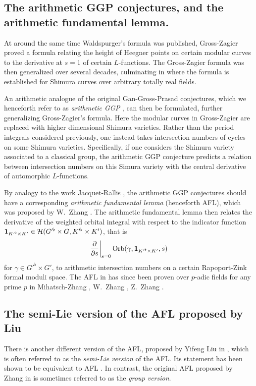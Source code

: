 \subsection{The arithmetic GGP conjectures, and the arithmetic fundamental lemma.}
At around the same time Waldspurger's formula was published,
Gross-Zagier \cite{ref:gross_zagier} proved a formula
relating the height of Heegner points
on certain modular curves to the derivative at $s=1$ of certain $L$-functions.
The Gross-Zagier formula was then generalized over several decades,
culminating in \cite{ref:GZshimura} where the formula is established
for Shimura curves over arbitrary totally real fields.

An arithmetic analogue of the original Gan-Gross-Prasad conjectures,
which we henceforth refer to as \emph{arithmetic GGP} \cite{ref:GGP},
can then be formulated, further generalizing Gross-Zagier's formula.
Here the modular curves in Gross-Zagier
are replaced with higher dimensional Shimura varieties.
Rather than the period integrals considered previously,
one instead takes intersection numbers of cycles on some Shimura varieties.
Specifically, if one considers the Shimura variety associated to a classical group,
the arithmetic GGP conjecture predicts a relation between intersection numbers
on this Simura variety with the central derivative of automorphic $L$-functions.

By analogy to the work Jacquet-Rallis \cite{ref:JR},
the arithmetic GGP conjectures should have a corresponding
\emph{arithmetic fundamental lemma} (henceforth AFL),
which was proposed by W.\ Zhang \cite[Conjecture 2.9]{ref:AFL}.
The arithmetic fundamental lemma then relates the derivative
of the weighted orbital integral with respect to the indicator function
$\mathbf{1}_{K'^\flat \times K'} \in \mathcal H(G'^\flat \times G, K'^\flat \times K')$, that is
\[ \left. \pdv{}{s} \right\rvert_{s=0} \operatorname{Orb}(\gamma, \mathbf{1}_{K'^\flat \times K'}, s) \]
for $\gamma \in G'^\flat \times G'$,
to arithmetic intersection numbers on a certain Rapoport-Zink formal moduli space.
The AFL in \cite{ref:AFL} has since been proven over $p$-adic fields for any prime $p$ in
Mihatsch-Zhang \cite{ref:MZ2021}, W.\ Zhang \cite{ref:Wei2021}, Z.\ Zhang \cite{ref:Zhiyu}.

\subsection{The semi-Lie version of the AFL proposed by Liu}
There is another different version of the AFL, proposed by Yifeng Liu in
\cite[Conjecture 1.12]{ref:liuFJ},
which is often referred to as the \emph{semi-Lie version} of the AFL.
Its statement has been shown to be equivalent to AFL
\cite[Remark 1.13]{ref:liuFJ}.
In contrast, the original AFL proposed by Zhang in \cite[Conjecture 2.9]{ref:AFL}
is sometimes referred to as the \emph{group version}.

